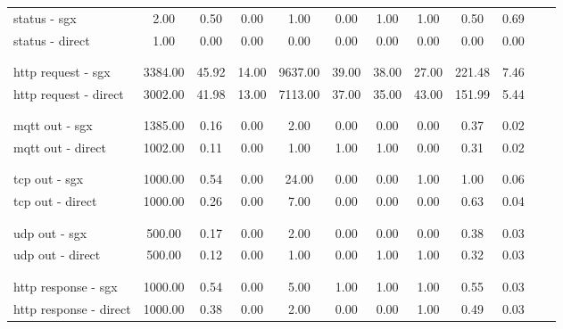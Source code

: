 \begin{tabular}{|l|c|c|c|c|c|c|c|c|c|c|c|}
\\ \hline \\ \hline 
status - sgx & 2.00 & 0.50 & 0.00 & 1.00 & 0.00 & 1.00 & 1.00 & 0.50 & 0.69\\ 
status - direct & 1.00 & 0.00 & 0.00 & 0.00 & 0.00 & 0.00 & 0.00 & 0.00 & 0.00\\ 
\\ \hline \\ \hline 
http request - sgx & 3384.00 & 45.92 & 14.00 & 9637.00 & 39.00 & 38.00 & 27.00 & 221.48 & 7.46\\ 
http request - direct & 3002.00 & 41.98 & 13.00 & 7113.00 & 37.00 & 35.00 & 43.00 & 151.99 & 5.44\\ 
\\ \hline \\ \hline 
mqtt out - sgx & 1385.00 & 0.16 & 0.00 & 2.00 & 0.00 & 0.00 & 0.00 & 0.37 & 0.02\\ 
mqtt out - direct & 1002.00 & 0.11 & 0.00 & 1.00 & 1.00 & 1.00 & 0.00 & 0.31 & 0.02\\ 
\\ \hline \\ \hline 
tcp out - sgx & 1000.00 & 0.54 & 0.00 & 24.00 & 0.00 & 0.00 & 1.00 & 1.00 & 0.06\\ 
tcp out - direct & 1000.00 & 0.26 & 0.00 & 7.00 & 0.00 & 0.00 & 0.00 & 0.63 & 0.04\\ 
\\ \hline \\ \hline 
udp out - sgx & 500.00 & 0.17 & 0.00 & 2.00 & 0.00 & 0.00 & 0.00 & 0.38 & 0.03\\ 
udp out - direct & 500.00 & 0.12 & 0.00 & 1.00 & 0.00 & 1.00 & 1.00 & 0.32 & 0.03\\ 
\\ \hline \\ \hline 
http response - sgx & 1000.00 & 0.54 & 0.00 & 5.00 & 1.00 & 1.00 & 1.00 & 0.55 & 0.03\\ 
http response - direct & 1000.00 & 0.38 & 0.00 & 2.00 & 0.00 & 0.00 & 1.00 & 0.49 & 0.03\\ 
\end{tabular}
